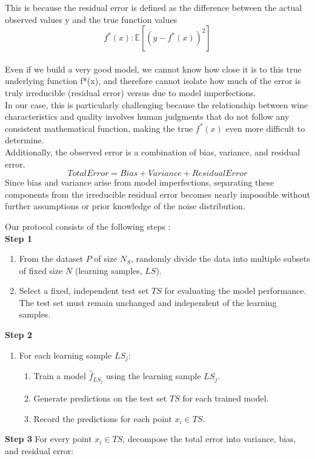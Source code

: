 \documentclass[a4paper,10pt]{article}
\begin{document}
    This is because the residual error is defined as the difference between the actual observed values y and the true function values \[ f^*(x): \mathbb{E}[(y - f^*(x))^2]\]\\
    Even if we build a very good model, we cannot know how close it is to this true underlying function f*(x), and therefore cannot isolate how much of the error is truly irreducible (residual error) versus due to model imperfections. \\
    
    In our case, this is particularly challenging because the relationship between wine characteristics and quality involves human judgments that do not follow any consistent mathematical function, making the true $f^*(x)$ even more difficult to determine. \\
    
    Additionally, the observed error is a combination of bias, variance, and residual error. \[ Total Error = Bias + Variance + ResidualError\] Since bias and variance arise from model imperfections, separating these components from the irreducible residual error becomes nearly impossible without further assumptions or prior knowledge of the noise distribution.
    

Our protocol consists of the following steps : \\ 

\textbf{Step 1}
\begin{enumerate}
    \item From the dataset \( P \) of size \( N_S \), randomly divide the data into multiple subsets of fixed size \( N \) (learning samples, \( LS \)).
    \item Select a fixed, independent test set \( TS \) for evaluating the model performance. The test set must remain unchanged and independent of the learning samples.
\end{enumerate}

\textbf{Step 2}
\begin{enumerate}
    \item For each learning sample \( LS_j \):
    \begin{enumerate}
        \item Train a model \( \hat{f}_{LS_j} \) using the learning sample \( LS_j \).
        \item Generate predictions on the test set \( TS \) for each trained model.
        \item Record the predictions for each point \( x_i \in TS \).
    \end{enumerate}
\end{enumerate}
\newpage
\textbf{Step 3} 
For every point \( x_i \in TS \), decompose the total error into variance, bias, and residual error:
\end{document}
